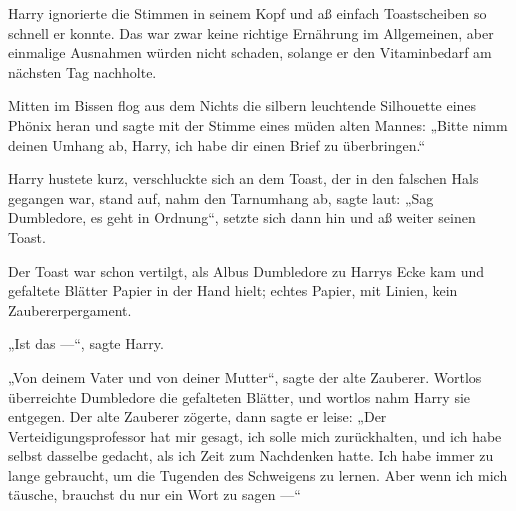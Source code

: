 Harry ignorierte die Stimmen in seinem Kopf und aß einfach Toastscheiben so schnell er konnte. Das war zwar keine richtige Ernährung im Allgemeinen, aber einmalige Ausnahmen würden nicht schaden, solange er den Vitaminbedarf am nächsten Tag nachholte.

Mitten im Bissen flog aus dem Nichts die silbern leuchtende Silhouette eines Phönix heran und sagte mit der Stimme eines müden alten Mannes:
„Bitte nimm deinen Umhang ab, Harry, ich habe dir einen Brief zu überbringen.“

Harry hustete kurz, verschluckte sich an dem Toast, der in den falschen Hals gegangen war, stand auf, nahm den Tarnumhang ab, sagte laut:
„Sag Dumbledore, es geht in Ordnung“, setzte sich dann hin und aß weiter seinen Toast.

Der Toast war schon vertilgt, als Albus Dumbledore zu Harrys Ecke kam und gefaltete Blätter Papier in der Hand hielt; echtes Papier, mit Linien, kein Zaubererpergament.

„Ist das —“, sagte Harry.

„Von deinem Vater und von deiner Mutter“, sagte der alte Zauberer. Wortlos überreichte Dumbledore die gefalteten Blätter, und wortlos nahm Harry sie entgegen. Der alte Zauberer zögerte, dann sagte er leise:
„Der Verteidigungsprofessor hat mir gesagt, ich solle mich zurückhalten, und ich habe selbst dasselbe gedacht, als ich Zeit zum Nachdenken hatte. Ich habe immer zu lange gebraucht, um die Tugenden des Schweigens zu lernen. Aber wenn ich mich täusche, brauchst du nur ein Wort zu sagen —“

